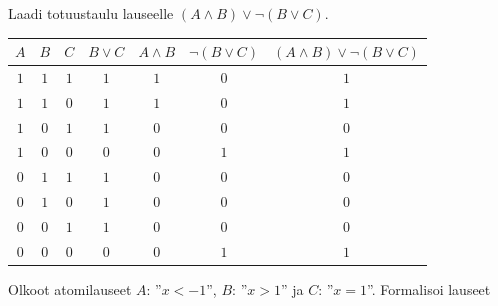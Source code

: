 \begin{tehtava}
    Laadi totuustaulu lauseelle $(A\land B)\lor \lnot (B\lor C)$.

    \begin{vastaus}
        \begin{center}
		    \begin{tabular}{|c|c|c|c|c|c|c|}\hline
		    $A$ & $B$ & $C$ & $B\lor C$ & $A\land B$ & $\lnot (B\lor C)$ & $(A\land B)\lor \lnot (B\lor C)$\\ \hline
		    $1$ & $1$ & $1$ & $1$ & $1$ & $0$ & $1$  \\ %
		    $1$ & $1$ & $0$ & $1$ & $1$ & $0$ & $1$  \\
		    $1$ & $0$ & $1$ & $1$ & $0$ & $0$ & $0$  \\
		    $1$ & $0$ & $0$ & $0$ & $0$ & $1$ & $1$  \\
		    $0$ & $1$ & $1$ & $1$ & $0$ & $0$ & $0$  \\
		    $0$ & $1$ & $0$ & $1$ & $0$ & $0$ & $0$  \\
		    $0$ & $0$ & $1$ & $1$ & $0$ & $0$ & $0$  \\
		    $0$ & $0$ & $0$ & $0$ & $0$ & $1$ & $1$  \\ \hline
\end{tabular}
\end{center}
    \end{vastaus}
    
\end{tehtava}

\begin{tehtava}
    Olkoot atomilauseet $A$: ''$x < -1$'', $B$: ''$x > 1$''  ja $C$: ''$x = 1$''. Formalisoi  lauseet
    \begin{alakohdat}
    \end{alakohdat}

    \begin{vastaus}
        \begin{alakohdat}
        \end{alakohdat}
    \end{vastaus}
    
\end{tehtava}


